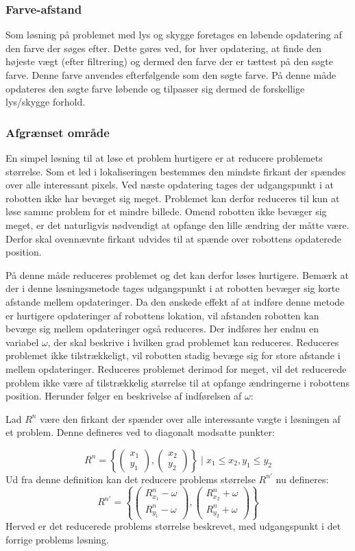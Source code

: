 \subsubsection{Farve-afstand}
Som løsning på problemet med lys og skygge foretages en løbende opdatering af den farve der søges efter.
Dette gøres ved, for hver opdatering, at finde den højeste vægt (efter filtrering) og dermed den farve der er tættest på den søgte farve.
Denne farve anvendes efterfølgende som den søgte farve.
På denne måde opdateres den søgte farve løbende og tilpasser sig dermed de forskellige lys/skygge forhold.

\subsubsection{Afgrænset område}
En simpel løsning til at løse et problem hurtigere er at reducere problemets størrelse.
Som et led i lokaliseringen bestemmes den mindste firkant der spændes over alle interessant pixels.
Ved næste opdatering tages der udgangspunkt i at robotten ikke har bevæget sig meget.
Problemet kan derfor reduceres til kun at løse samme problem for et mindre billede.
Omend robotten ikke bevæger sig meget, er det naturligvis nødvendigt at opfange den lille ændring der måtte være.
Derfor skal ovennævnte firkant udvides til at spænde over robottens opdaterede position.

På denne måde reduceres problemet og det kan derfor løses hurtigere.
Bemærk at der i denne løsningsmetode tages udgangspunkt i at robotten bevæger sig korte afstande mellem opdateringer.
Da den ønskede effekt af at indføre denne metode er hurtigere opdateringer af robottens lokation, vil afstanden robotten kan bevæge sig mellem opdateringer også reduceres.
Der indføres her endnu en variabel $\omega$, der skal beskrive i hvilken grad problemet kan reduceres.
Reduceres problemet ikke tilstrækkeligt, vil robotten stadig bevæge sig for store afstande i mellem opdateringer.
Reduceres problemet derimod for meget, vil det reducerede problem ikke være af tilstrækkelig størrelse til at opfange ændringerne i robottens position.
Herunder følger en beskrivelse af indførelsen af $\omega$:

Lad $R^n$ være den firkant der spænder over alle interessante vægte i løsningen af et problem.
Denne defineres ved to diagonalt modsatte punkter:
{
\newcommand{\cvec}[2]{\begin{pmatrix}#1\\#2\end{pmatrix}}

$$R^n = \left\{\cvec{x_1}{y_1}, \cvec{x_2}{y_2}\right\} \mid x_1 \leq x_2 , y_1 \leq y_2$$
Ud fra denne definition kan det reducere problems størrelse $R^{n'}$ nu defineres:
\begin{equation}
R^{n'} = \left\{
	\cvec{R^n_{x_1}-\omega}{R^n_{y_1}-\omega},
	\cvec{R^n_{x_2}+\omega}{R^n_{y_2}+\omega}
\right\}
\end{equation}
Herved er det reducerede problems størrelse beskrevet, med udgangspunkt i det forrige problems løsning.
}

